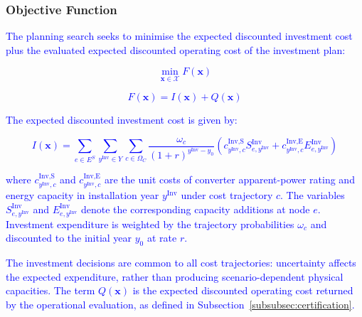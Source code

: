 \documentclass[preprint,12pt]{elsarticle}
\begin{document}
\subsubsection{Objective Function}

\textcolor{blue}{The planning search seeks to minimise the expected discounted investment cost plus the evaluated expected discounted operating cost of the investment plan:}

\textcolor{blue}{
    \begin{equation}
        \min_{\boldsymbol{x}\in\mathcal{X}} F(\boldsymbol{x})
        \label{eq:master_objective}
    \end{equation}
}

\textcolor{blue}{
    \begin{equation}
        F(\boldsymbol{x}) = I(\boldsymbol{x}) + Q(\boldsymbol{x})
        \label{eq:master_objective_value}
    \end{equation}
}

\textcolor{blue}{
    The expected discounted investment cost is given by:
}

\textcolor{blue}{
    \begin{equation}
        I(\boldsymbol{x}) = \sum_{e\in E^S} \sum_{y^{\text{Inv}}\in Y} \sum_{c\in\Omega_C} \frac{\omega_c}{(1+r)^{y^{\text{Inv}}-y_0}}
        \left(
            c^{\text{Inv,S}}_{y^{\text{Inv}},c} S^{\text{Inv}}_{e,y^{\text{Inv}}}
            +
            c^{\text{Inv,E}}_{y^{\text{Inv}},c} E^{\text{Inv}}_{e,y^{\text{Inv}}}
        \right)
    \end{equation}
}

\noindent
\textcolor{blue}{
    where $c^{\text{Inv,S}}_{y^{\text{Inv}},c}$ and $c^{\text{Inv,E}}_{y^{\text{Inv}},c}$ are the unit costs of converter apparent-power rating and energy capacity in installation year $y^{\text{Inv}}$ under cost trajectory $c$.
    The variables $S^{\text{Inv}}_{e,y^{\text{Inv}}}$ and $E^{\text{Inv}}_{e,y^{\text{Inv}}}$ denote the corresponding capacity additions at node $e$. Investment expenditure is weighted by the trajectory probabilities $\omega_c$ and discounted to the initial year $y_0$ at rate $r$.
}

\textcolor{blue}{
    The investment decisions are common to all cost trajectories: uncertainty affects the expected expenditure, rather than producing scenario-dependent physical capacities.
    The term $Q(\boldsymbol{x})$ is the expected discounted operating cost returned by the operational evaluation, as defined in Subsection~\ref{subsubsec:certification}.
}
\end{document}
